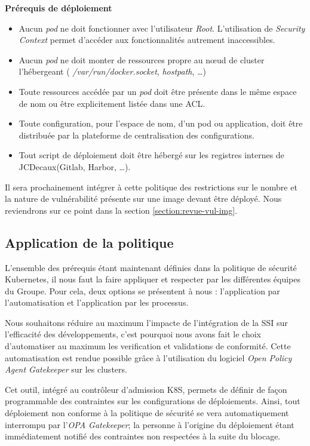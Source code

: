 \newpage

\textbf{Prérequis de déploiement}
\begin{itemize}
    \item Aucun \emph{pod} ne doit fonctionner avec l'utilisateur \emph{Root}. L'utilisation de \emph{Security Context} 
    permet d'accéder aux fonctionnalités autrement inaccessibles.
    \item Aucun \emph{pod} ne doit monter de ressources propre au nœud de cluster l'hébergeant (\ie 
    \emph{/var/run/docker.socket}, \emph{hostpath}, \dots)
    \item Toute ressources accédée par un \emph{pod} doit être présente dans le même espace de nom ou être explicitement 
    listée dans une \ac{ACL}.
    \item Toute configuration, pour l'espace de nom, d'un pod ou application, doit être distribuée par la plateforme de 
    centralisation des configurations.
    \item Tout script de déploiement doit être hébergé sur les registres internes de JCDecaux(\ie Gitlab, Harbor, \dots).
\end{itemize}

Il sera prochainement intégrer à cette politique des restrictions sur le nombre et la nature de vulnérabilité présente 
sur une image devant être déployé. Nous reviendrons sur ce point dans la section \ref{section:revue-vul-img}.
\subsection{Application de la politique}
L'ensemble des prérequis étant maintenant définies dans la politique de sécurité Kubernetes, il nous faut la faire 
appliquer et respecter par les différentes équipes du Groupe.
\newline Pour cela, deux options se présentent à nous : l'application par l'automatisation et l'application par les
processus.

Nous souhaitons réduire au maximum l'impacte de l'intégration de la \ac{SSI} sur l'efficacité des développements, c'est 
pourquoi nous avons fait le choix d'automatiser au maximum les verification et validations de conformité.
\newline Cette automatisation est rendue possible grâce à l'utilisation du logiciel \emph{Open Policy Agent Gatekeeper}
sur les clusters.

Cet outil, intégré au contrôleur d'admission \ac{K8S}, permets de définir de façon programmable des contraintes sur les
configurations de déploiements. Ainsi, tout déploiement non conforme à la politique de sécurité se vera automatiquement 
interrompu par l'\emph{OPA Gatekeeper}; la personne à l'origine du déploiement étant immédiatement notifié des 
contraintes non respectées à la suite du blocage.

